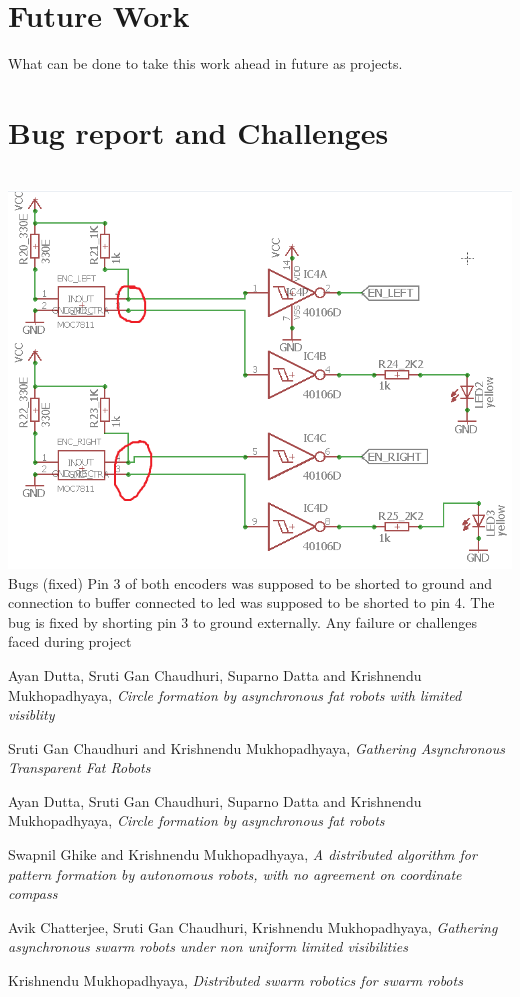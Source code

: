\documentclass[a4paper,12pt,oneside]{book}
\begin{document}
\section{Future Work}
What can be done to take this work ahead in future as projects.

\section{Bug report and Challenges}
\hfill\\
	\includegraphics[width=\textwidth]{./Capture2.png}
\hfill\\
Bugs (fixed)
Pin 3 of both encoders was supposed to be shorted to ground and connection to buffer connected to led was supposed to be shorted to pin 4. The bug is fixed by shorting pin 3 to ground externally.
Any failure or challenges faced during project

\begin{thebibliography}{li}
Ayan Dutta, Sruti Gan Chaudhuri, Suparno Datta and Krishnendu Mukhopadhyaya,
{\em Circle formation by asynchronous fat robots with limited visiblity}

Sruti Gan Chaudhuri and Krishnendu Mukhopadhyaya,
{\em Gathering Asynchronous Transparent Fat Robots}

Ayan Dutta, Sruti Gan Chaudhuri, Suparno Datta and Krishnendu Mukhopadhyaya,
{\em Circle formation by asynchronous fat robots}

Swapnil Ghike and Krishnendu Mukhopadhyaya,
{\em A distributed algorithm for pattern formation by autonomous robots, with no agreement on coordinate compass}

Avik Chatterjee, Sruti Gan Chaudhuri, Krishnendu Mukhopadhyaya,
{\em Gathering asynchronous swarm robots under non uniform limited visibilities}

Krishnendu Mukhopadhyaya,
{\em Distributed swarm robotics for swarm robots}
\end{thebibliography}
\end{document}
